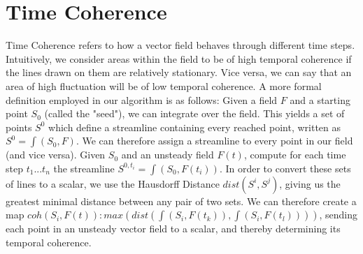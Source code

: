 \section{Time Coherence}
Time Coherence refers to how a vector field behaves through different time steps.
Intuitively, we consider areas within the field to be of high temporal coherence if the lines drawn on them are relatively stationary.
Vice versa, we can say that an area of high fluctuation will be of low temporal coherence.
A more formal definition employed in our algorithm is as follows:
Given a field $F$ and a starting point $S_0$ (called the "seed"), we can integrate over the field.
This yields a set of points $S^0$ which define a streamline containing every reached point, written as $S^0 = \int(S_0, F)$.
We can therefore assign a streamline to every point in our field (and vice versa).
Given $S_0$ and an unsteady field $F(t)$, compute for each time step $t_1...t_n$ the streamline $S^{0,t_i} = \int(S_0, F(t_i))$.
In order to convert these sets of lines to a scalar, we use the Hausdorff Distance $dist(S^i,S^j)$,
giving us the greatest minimal distance between any pair of two sets.
We can therefore create a map $coh(S_i, F(t)): max(dist(\int(S_i, F(t_k)), \int(S_i, F(t_l))))$,
sending each point in an unsteady vector field to a scalar, and thereby determining its temporal coherence.
